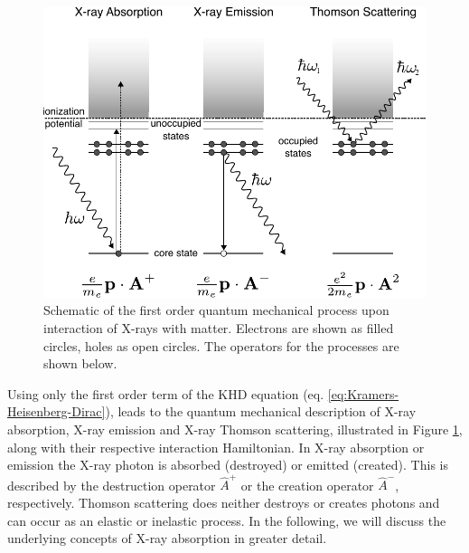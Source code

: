 \begin{figure}[H]
    \centering
    \includegraphics[width=0.8\linewidth]{Figures/first_order_interaction_processes.pdf}
    \caption{Schematic of the first order quantum mechanical process upon interaction of X-rays with matter. Electrons are shown as filled circles, holes as open circles. The operators for the processes are shown below.}
    \label{fig:Overview_first_order_processes}
\end{figure}
\noindent
Using only the first order term of the KHD equation (eq. \ref{eq:Kramers-Heisenberg-Dirac}), leads to the quantum mechanical description of X-ray absorption, X-ray emission and X-ray Thomson scattering, illustrated in Figure \ref{fig:Overview_first_order_processes}, along with their respective interaction Hamiltonian. In X-ray absorption or emission the X-ray photon is absorbed (destroyed) or emitted (created). This is described by the destruction operator $\hat{A}^{+}$ or the creation operator $\hat{A}^{-}$, respectively. Thomson scattering does neither destroys or creates photons and can occur as an elastic or inelastic process. In the following, we will discuss the underlying concepts of X-ray absorption in greater detail.
